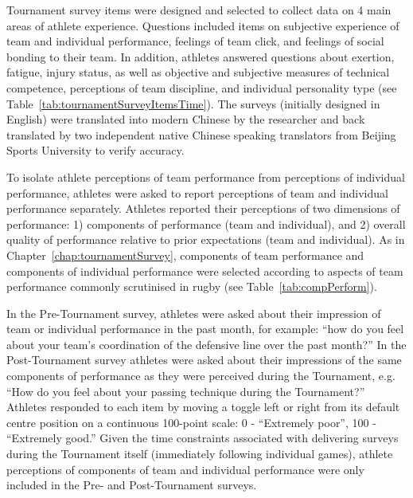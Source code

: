 \begin{CJK}{UTF8}{gbsn}
Tournament survey items were designed and selected to collect data on 4 main areas of athlete experience.  Questions included items on subjective experience of team and individual performance, feelings of team click, and feelings of social bonding to their team.  In addition, athletes answered questions about exertion, fatigue, injury status, as well as objective and subjective measures of technical competence, perceptions of team discipline, and individual personality type (see Table~\ref{tab:tournamentSurveyItemsTime}). The surveys (initially designed in English) were translated into modern Chinese by the researcher and back translated by two independent native Chinese speaking translators from Beijing Sports University to verify accuracy.






To isolate athlete perceptions of team performance from perceptions of individual performance, athletes were asked to report perceptions of team and individual performance separately.  Athletes reported their perceptions of two dimensions of performance: 1) components of performance (team and individual), and 2) overall quality of performance relative to prior expectations (team and individual). As in Chapter~\ref{chap:tournamentSurvey}, components of team performance and components of individual performance were selected according to aspects of team performance commonly scrutinised in rugby (see Table~\ref{tab:compPerform}).




In the Pre-Tournament survey, athletes were asked about their impression of team or individual performance in the past month, for example: ``how do you feel about your team's coordination of the defensive line over the past month?''  In the Post-Tournament survey athletes were asked about their impressions of the same components of performance as they were perceived during the Tournament, e.g. ``How do you feel about your passing technique during the Tournament?'' Athletes responded to each item by moving a toggle left or right from its default centre position on a continuous 100-point scale: 0 - ``Extremely poor'', 100 - ``Extremely good.''  Given the time constraints associated with delivering surveys during the Tournament itself (immediately following individual games), athlete perceptions of components of team and individual performance were only included in the Pre- and Post-Tournament surveys.


\end{CJK}

